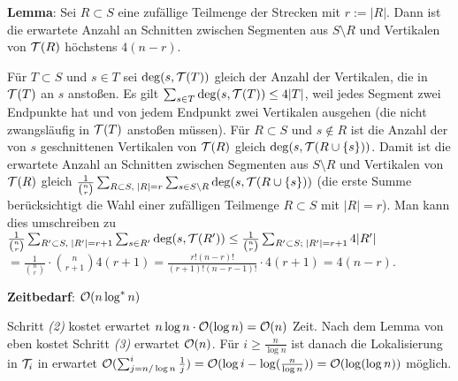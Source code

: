 \linie

\textbf{Lemma}:
Sei $R \subset S$ eine zufällige Teilmenge der Strecken mit $r := |R|$.
Dann ist die erwartete Anzahl an Schnitten zwischen Segmenten aus $S \setminus R$ und
Vertikalen von $\mathcal{T}(R)$ höchstens $4(n-r)$.

\begin{Beweis}
    Für $T \subset S$ und $s \in T$ sei $\deg(s, \mathcal{T}(T))$
    gleich der Anzahl der Vertikalen, die in $\mathcal{T}(T)$ an $s$ anstoßen.
    Es gilt $\sum_{s \in T} \deg(s, \mathcal{T}(T)) \le 4|T|$, weil
    jedes Segment zwei Endpunkte hat und von jedem Endpunkt zwei Vertikalen ausgehen
    (die nicht zwangsläufig in $\mathcal{T}(T)$ anstoßen müssen).
    Für $R \subset S$ und $s \notin R$ ist die Anzahl der von $s$ geschnittenen
    Vertikalen von $\mathcal{T}(R)$ gleich $\deg(s, \mathcal{T}(R \cup \{s\}))$.
    Damit ist die erwartete Anzahl an Schnitten zwischen Segmenten aus $S \setminus R$ und
    Vertikalen von $\mathcal{T}(R)$ gleich
    $\frac{1}{\binom{n}{r}} \sum_{R \subset S,\; |R| = r}
    \sum_{s \in S \setminus R} \deg(s, \mathcal{T}(R \cup \{s\}))$
    (die erste Summe berücksichtigt die Wahl einer zufälligen Teilmenge $R \subset S$
    mit $|R| = r$).
    Man kann dies umschreiben zu
    $\frac{1}{\binom{n}{r}} \sum_{R' \subset S,\; |R'| = r+1} \sum_{s \in R'} \deg(s, \mathcal{T}(R'))
    \le \frac{1}{\binom{n}{r}} \sum_{R' \subset S;\; |R'| = r+1} 4|R'|$\\
    $= \frac{1}{\binom{n}{r}} \cdot \binom{n}{r+1} 4(r+1)
    = \frac{r!(n-r)!}{(r+1)!(n-r-1)!} \cdot 4(r+1)
    = 4(n-r)$.
\end{Beweis}

\linie

\textbf{Zeitbedarf}:
$\mathcal{O}(n \log^\ast n)$

\begin{Beweis}
    Schritt \emph{(2)} kostet erwartet $n \log n \cdot \mathcal{O}(\log n) = \mathcal{O}(n)$ Zeit.
    Nach dem Lemma von eben kostet Schritt \emph{(3)} erwartet $\mathcal{O}(n)$.
    Für $i \ge \frac{n}{\log n}$ ist danach die Lokalisierung in $\mathcal{T}_i$ in erwartet
    $\mathcal{O}(\sum_{j=n/\log n}^i \frac{1}{j})
    = \mathcal{O}(\log i - \log(\frac{n}{\log n}))
    = \mathcal{O}(\log(\log n))$ möglich.
\end{Beweis}

\pagebreak
